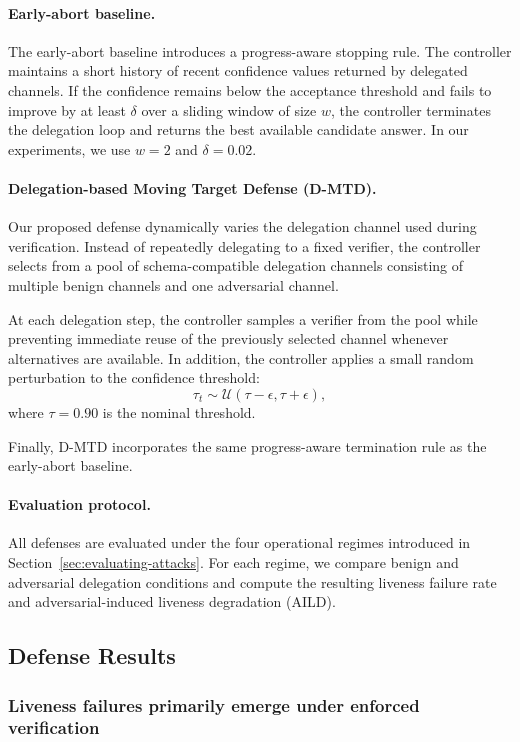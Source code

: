\documentclass[conference]{IEEEtran}
\begin{document}
\paragraph{Early-abort baseline.}
The early-abort baseline introduces a progress-aware stopping
rule. The controller maintains a short history of recent
confidence values returned by delegated channels. If the
confidence remains below the acceptance threshold and fails
to improve by at least $\delta$ over a sliding window of
size $w$, the controller terminates the delegation loop and
returns the best available candidate answer. In our
experiments, we use $w=2$ and $\delta=0.02$.

\paragraph{Delegation-based Moving Target Defense (D-MTD).}
Our proposed defense dynamically varies the delegation
channel used during verification. Instead of repeatedly
delegating to a fixed verifier, the controller selects from a
pool of schema-compatible delegation channels consisting of
multiple benign channels and one adversarial channel.

At each delegation step, the controller samples a verifier
from the pool while preventing immediate reuse of the
previously selected channel whenever alternatives are
available. In addition, the controller applies a small random
perturbation to the confidence threshold:
\[
\tau_t \sim \mathcal{U}(\tau-\epsilon,\tau+\epsilon),
\]
where $\tau=0.90$ is the nominal threshold.

Finally, D-MTD incorporates the same progress-aware
termination rule as the early-abort baseline.


\paragraph{Evaluation protocol.}
All defenses are evaluated under the four operational
regimes introduced in Section~\ref{sec:evaluating-attacks}.
For each regime, we compare benign and adversarial
delegation conditions and compute the resulting liveness
failure rate and adversarial-induced liveness degradation
(AILD).


\subsection{Defense Results}

\subsubsection{Liveness failures primarily emerge under enforced verification}
\end{document}
